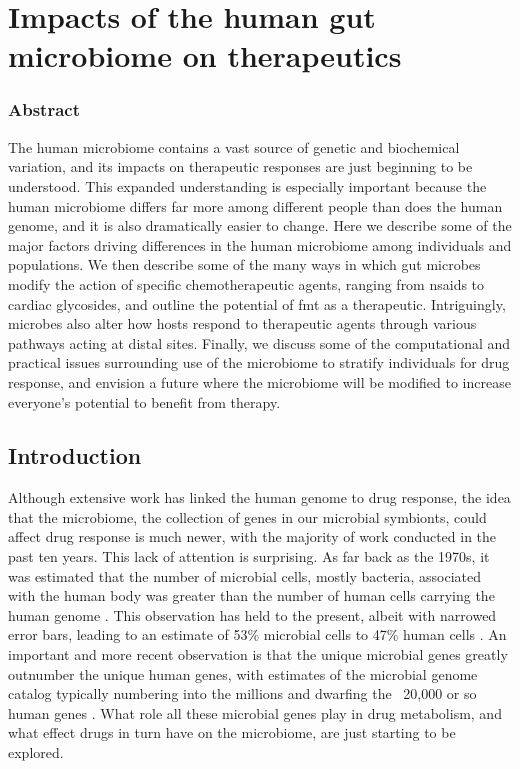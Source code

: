 \glsresetall

\section{Impacts of the human gut microbiome on therapeutics}

\subsubsection{Abstract}

The human microbiome contains a vast source of genetic and biochemical variation, and its impacts on therapeutic responses are just beginning to be understood. This expanded understanding is especially important because the human microbiome differs far more among different people than does the human genome, and it is also dramatically easier to change. Here we describe some of the major factors driving differences in the human microbiome among individuals and populations. We then describe some of the many ways in which gut microbes modify the action of specific chemotherapeutic agents, ranging from \glspl{nsaid} to cardiac glycosides, and outline the potential of \gls{fmt} as a therapeutic. Intriguingly, microbes also alter how hosts respond to therapeutic agents through various pathways acting at distal sites. Finally, we discuss some of the computational and practical issues surrounding use of the microbiome to stratify individuals for drug response, and envision a future where the microbiome will be modified to increase everyone's potential to benefit from therapy.

\subsection{Introduction}

Although extensive work has linked the human genome to drug response, the idea that the microbiome, the collection of genes in our microbial symbionts, could affect drug response is much newer, with the majority of work conducted in the past ten years. This lack of attention is surprising. As far back as the 1970s, it was estimated that the number of microbial cells, mostly bacteria, associated with the human body was greater than the number of human cells carrying the human genome \cite{RN4045}. This observation has held to the present, albeit with narrowed error bars, leading to an estimate of 53\% microbial cells to 47\% human cells \cite{RN4039}. An important and more recent observation is that the unique microbial genes greatly outnumber the unique human genes, with estimates of the microbial genome catalog typically numbering into the millions \cite{RN4107,RN4041,RN4040} and dwarfing the ~20,000 or so human genes \cite{RN4043}. What role all these microbial genes play in drug metabolism, and what effect drugs in turn have on the microbiome, are just starting to be explored.

